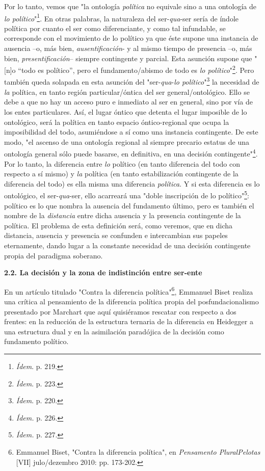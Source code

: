 \documentclass{book}
\begin{document}
Por lo tanto, vemos que "la ontología \emph{política} no equivale sino a
una ontología de \emph{lo político}"\footnote{\emph{Ídem}. p. 219.}. En
otras palabras, la naturaleza del ser-\emph{qua}-ser sería de índole
política por cuanto el ser como diferenciante, y como tal infundable, se
corresponde con el movimiento de lo político ya que éste supone una
instancia de ausencia --o, más bien, \emph{ausentificación}- y al mismo
tiempo de presencia --o, más bien, \emph{presentificación}-- siempre
contingente y parcial. Esta asunción supone que "{[}n{]}o ``todo es
político'', pero el fundamento/abismo de todo es \emph{lo
político}"\footnote{\emph{Ídem}. p. 223.}. Pero también queda solapada
en esta asunción del "ser-\emph{qua}-\emph{lo político}"\footnote{\emph{Ídem}.
  p. 220.} la necesidad de \emph{la} política, en tanto región
particular/óntica del ser general/ontológico. Ello se debe a que no hay
un acceso puro e inmediato al ser en general, sino por vía de los entes
particulares. Así, el lugar óntico que detenta el lugar imposible de lo
ontológico, será la política en tanto espacio óntico-regional que ocupa
la imposibilidad del todo, asumiéndose a sí como una instancia
contingente. De este modo, "el ascenso de una ontología regional al
siempre precario estatus de una ontología general sólo puede basarse, en
definitiva, en una decisión contingente"\footnote{\emph{Ídem.} p. 226.}.
Por lo tanto, la diferencia entre \emph{lo} político (en tanto
diferencia del todo con respecto a sí mismo) y \emph{la} política (en
tanto estabilización contingente de la diferencia del todo) es ella
misma una diferencia \emph{política}. Y si esta diferencia es lo
ontológico, el ser-\emph{qua}-ser, ello acarreará una "doble inscripción
de lo político"\footnote{\emph{Ídem.} p. 227.}: político es lo que
nombra la ausencia del fundamento último, pero es también el nombre de
la \emph{distancia} entre dicha ausencia y la presencia contingente de
la política. El problema de esta definición será, como veremos, que en
dicha distancia, ausencia y presencia se confunden e intercambian sus
papeles eternamente, dando lugar a la constante necesidad de una
decisión contingente propia del paradigma soberano.

\textbf{2.2. La decisión y la zona de indistinción entre ser-ente}

En un artículo titulado "Contra la diferencia política"\footnote{Emmanuel
  Biset, "Contra la diferencia política", en \emph{Pensamento
  Plural\textbar Pelotas} {[}VII{]} julo/dezembro 2010: pp. 173-202.},
Emmanuel Biset realiza una crítica al pensamiento de la diferencia
política propia del posfundacionalismo presentado por Marchart que aquí
quisiéramos rescatar con respecto a dos frentes: en la reducción de la
estructura ternaria de la diferencia en Heidegger a una estructura dual
y en la asimilación paradójica de la decisión como fundamento político.
\end{document}

